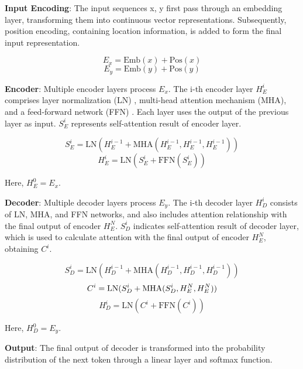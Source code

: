 \documentclass[conference]{IEEEtran}
\begin{document}
\textbf{Input Encoding}: The input sequences x, y first pass through an embedding layer, transforming them into continuous vector representations. Subsequently, position encoding, containing location information, is added to form the final input representation.

\begin{equation}
E_x = \text{Emb}(x) + \text{Pos}(x) 
\end{equation}
\begin{equation}
E_y = \text{Emb}(y) + \text{Pos}(y)
\end{equation}

\textbf{Encoder}: Multiple encoder layers process $E_x$. The i-th encoder layer $H_E^i$ comprises layer normalization (LN) \cite{ba2016layer}, multi-head attention mechanism (MHA), and a feed-forward network (FFN) \cite{vaswani2017attention}. Each layer uses the output of the previous layer as input. $S_E^i$ represents self-attention result of encoder layer.

\begin{equation}
S_E^i = \text{LN}(H_E^{i-1} + \text{MHA}(H_E^{i-1}, H_E^{i-1}, H_E^{i-1}))
\end{equation}
\begin{equation}
H_E^i = \text{LN}(S_E^i + \text{FFN}(S_E^i))
\end{equation}

Here, $H_E^0 = E_x$.

\textbf{Decoder}: Multiple decoder layers process $E_y$. The i-th decoder layer $H_D^i$ consists of LN, MHA, and FFN networks, and also includes attention relationship with the final output of encoder $H_E^N$. $S_D^i$ indicates self-attention result of decoder layer, which is used to calculate attention with the final output of encoder $H_E^N$, obtaining $C^i$.

\begin{equation}
S_D^i = \text{LN}(H_D^{i-1} + \text{MHA}(H_D^{i-1}, H_D^{i-1}, H_D^{i-1}))
\end{equation}
\begin{equation}
C^i = \text{LN}(S_D^i + \text{MHA}(S_D^i, H_E^N, H_E^N)) \\
\end{equation}
\begin{equation}
H_D^i = \text{LN}(C^i + \text{FFN}(C^i))
\end{equation}

Here, $H_D^0 = E_y$.

\textbf{Output}: The final output of decoder is transformed into the probability distribution of the next token through a linear layer and softmax function.
\end{document}
